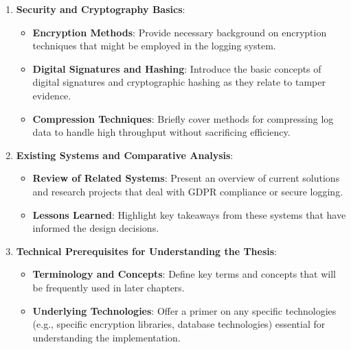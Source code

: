 \begin{enumerate}
\begin{itemize}
              \end{itemize}
        \item \textbf{Security and Cryptography Basics}:
              \begin{itemize}
                      \item \textbf{Encryption Methods}:
                            Provide necessary background on encryption techniques that might be employed in the logging system.
                      \item \textbf{Digital Signatures and Hashing}:
                            Introduce the basic concepts of digital signatures and cryptographic hashing as they relate to tamper evidence.
                      \item \textbf{Compression Techniques}:
                            Briefly cover methods for compressing log data to handle high throughput without sacrificing efficiency.
              \end{itemize}
        \item \textbf{Existing Systems and Comparative Analysis}:
              \begin{itemize}
                      \item \textbf{Review of Related Systems}:
                            Present an overview of current solutions and research projects that deal with GDPR compliance or secure logging.
                      \item \textbf{Lessons Learned}:
                            Highlight key takeaways from these systems that have informed the design decisions.
              \end{itemize}
        \item \textbf{Technical Prerequisites for Understanding the Thesis}:
              \begin{itemize}
                      \item \textbf{Terminology and Concepts}:
                            Define key terms and concepts that will be frequently used in later chapters.
                      \item \textbf{Underlying Technologies}:
                            Offer a primer on any specific technologies (e.g., specific encryption libraries, database technologies) essential for understanding the implementation.
              \end{itemize}
\end{enumerate}